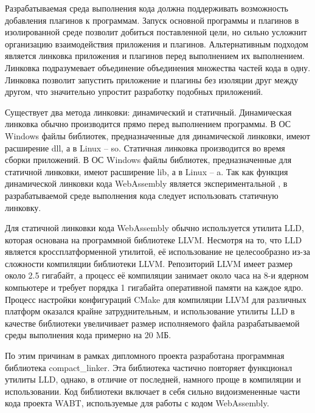 Разрабатываемая среда выполнения кода должна поддерживать возможность добавления плагинов к программам.
Запуск основной программы и плагинов в изолированной среде позволит добиться поставленной цели, но сильно усложнит организацию взаимодействия приложения и плагинов.
Альтернативным подходом является линковка приложения и плагинов перед выполнением их выполнением.
Линковка подразумевает объединение объединения множества частей кода в одну.
Линковка позволит запустить приложение и плагины без изоляции друг между другом, что значительно упростит разработку подобных приложений.

Существует два метода линковки: динамический и статичный.
Динамическая линковка обычно производится прямо перед выполнением программы.
В ОС Windows файлы библиотек, предназначенные для динамической линковки, имеют расширение dll, а в Linux -- so.
Статичная линковка производится во время сборки приложений.
В ОС Windows файлы библиотек, предназначенные для статичной линковки, имеют расширение lib, а в Linux -- a.
Так как функция динамической линковки кода WebAssembly является экспериментальной \cite{WASMDynamicLinking}, в разрабатываемой среде выполнения кода следует использовать статичную линковку.

Для статичной линковки кода WebAssembly обычно используется утилита LLD, которая основана на программной библиотеке LLVM.
Несмотря на то, что LLD является кроссплатформенной утилитой, её использование не целесообразно из-за сложности компиляции библиотеки LLVM.
Репозиторий LLVM имеет размер около 2.5 гигабайт, а процесс её компиляции занимает около часа на 8-и ядерном компьютере и требует порядка 1 гигабайта оперативной памяти на каждое ядро.
Процесс настройки конфигураций CMake для компиляции LLVM для различных платформ оказался крайне затруднительным, и использование утилиты LLD в качестве библиотеки увеличивает размер исполняемого файла разрабатываемой среды выполнения кода примерно на 20 MБ.

По этим причинам в рамках дипломного проекта разработана программная библиотека compact\_linker. 
Эта библиотека частично повторяет функционал утилиты LLD, однако, в отличие от последней, намного проще в компиляции и использовании.
Код библиотеки включает в себя сильно видоизмененные части кода проекта WABT, используемые для работы с кодом WebAssembly.
